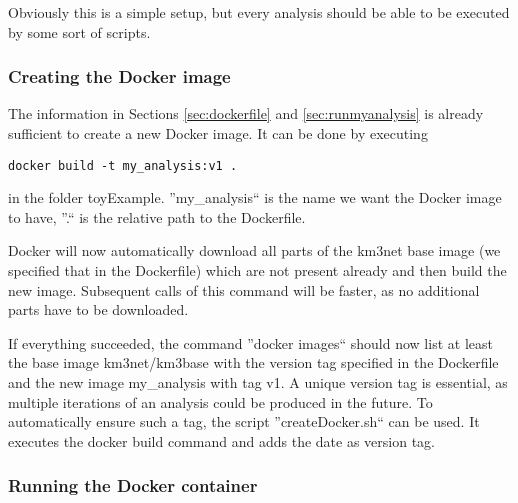 \documentclass[a4paper, twoside, 11pt]{article}
\begin{document}
Obviously this is a simple setup, but every analysis should be able to be executed by some sort of scripts. 

\subsubsection{Creating the Docker image}
\label{sec:createImage}
The information in Sections \ref{sec:dockerfile} and \ref{sec:runmyanalysis} 
is already sufficient to create a new Docker image. 
It can be done by executing
\begin{lstlisting}[basicstyle=\ttfamily\small,columns=flexible,keepspaces=true,frame=single]
docker build -t my_analysis:v1 .
\end{lstlisting}
in the folder toyExample. 
''my\_analysis`` is the name we want the Docker image to have, 
''.`` is the relative path to the Dockerfile.

Docker will now automatically download all parts of the km3net base image 
(we specified that in the Dockerfile)
which are not present already and then build the new image. 
Subsequent calls of this command will be faster, as no additional parts have to be downloaded. 

If everything succeeded, the command ''docker images`` 
should now list at least the base image km3net/km3base 
with the version tag specified in the Dockerfile and 
the new image my\_analysis with tag v1. 
A unique version tag is essential, as multiple iterations of an analysis could be produced in the future. 
To automatically ensure such a tag, the script ''createDocker.sh`` can be used.
It executes the docker build command and adds the date as version tag. 


\subsubsection{Running the Docker container}
\label{sec:runContainer}
\end{document}
